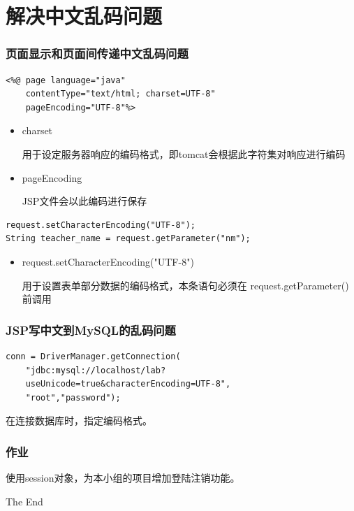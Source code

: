 \documentclass{beamer}
\begin{document}
\section{解决中文乱码问题}
\begin{frame}[fragile]
\frametitle{页面显示和页面间传递中文乱码问题}
\begin{lstlisting}
<%@ page language="java" 
    contentType="text/html; charset=UTF-8"
    pageEncoding="UTF-8"%>
\end{lstlisting}
\begin{itemize}
\item
charset

用于设定服务器响应的编码格式，即tomcat会根据此字符集对响应进行编码
\item
pageEncoding

JSP文件会以此编码进行保存
\end{itemize}
\begin{lstlisting}
request.setCharacterEncoding("UTF-8");
String teacher_name = request.getParameter("nm");
\end{lstlisting}
\begin{itemize}
\item
request.setCharacterEncoding("UTF-8")

用于设置表单部分数据的编码格式，本条语句必须在 request.getParameter()前调用
\end{itemize}
\end{frame}
\begin{frame}[fragile]
\frametitle{JSP写中文到MySQL的乱码问题}
\begin{lstlisting}
conn = DriverManager.getConnection(
    "jdbc:mysql://localhost/lab?
    useUnicode=true&characterEncoding=UTF-8",
    "root","password");
\end{lstlisting}
在连接数据库时，指定编码格式。				
\end{frame}
\begin{frame}
\frametitle{作业}

使用session对象，为本小组的项目增加登陆注销功能。
\end{frame}



\begin{frame}
\Huge{\centerline{The End}}
\end{frame}




\end{document}
